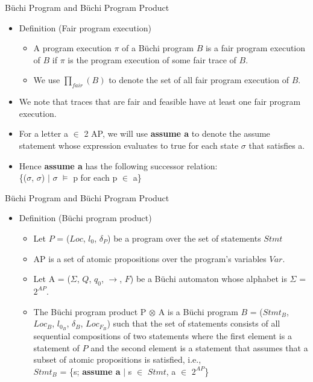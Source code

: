 \documentclass[12pt]{beamer}
\begin{document}
\begin{frame}{B\"uchi Program and B\"uchi Program Product}
  	\begin{itemize}
		\item Definition (Fair program execution)
		\begin{itemize}
			\item A program execution $\pi$ of a B\"uchi program $B$ is a fair program execution of $B$ if $\pi$ is the program execution of some fair trace of $B$. 
			\item We use $\prod_{fair}(B)$ to denote the set of all fair program execution of $B$.
		\end{itemize}
		\item We note that traces that are fair and feasible have at least one fair program execution.
		\item For a letter a $\in$ 2 AP, we will use \textbf{assume a} to denote the assume statement whose expression evaluates to true for each state $\sigma$ that satisfies a. 
		\item Hence \textbf{assume a} has the following successor relation:\\ \{($\sigma$, $\sigma$\textquotesingle) $\mid$ $\sigma$ $\models$ p for each p $\in$ a\}
  	\end{itemize}
\end{frame}

\begin{frame}{B\"uchi Program and B\"uchi Program Product}
  	\begin{itemize}
		\item Definition (B\"uchi program product)
		\begin{itemize}
			\item Let $P$ = ($Loc$, $l_{0}$, $\delta_{P}$) be a program over the set of statements $Stmt$
			\item AP is a set of atomic propositions over the program’s variables $Var$.
			\item Let A = ($\Sigma$, $Q$, $q_{0}$, $\rightarrow$, $F$) be a B\"uchi automaton whose alphabet is $\Sigma$ = $2^{AP}$.
			\item The B\"uchi program product P $\otimes$ A is a B\"uchi program $B$ = ($Stmt_{B}$, $Loc_{B}$, $l_{{0}_{B}}$, $\delta_{B}$, $Loc_{{F}_{B}}$) such that the set of statements consists of all sequential compositions of two statements where the first element is a statement of $P$ and the second element is a statement that assumes that a subset of atomic propositions is satisfied, i.e.,\\
			$Stmt_{B}$ = \{s; \textbf{assume a} $\mid$ s $\in$ $Stmt$, a $\in$ $2^{AP}$\}

		\end{itemize}
  	\end{itemize}
\end{frame}
\end{document}
